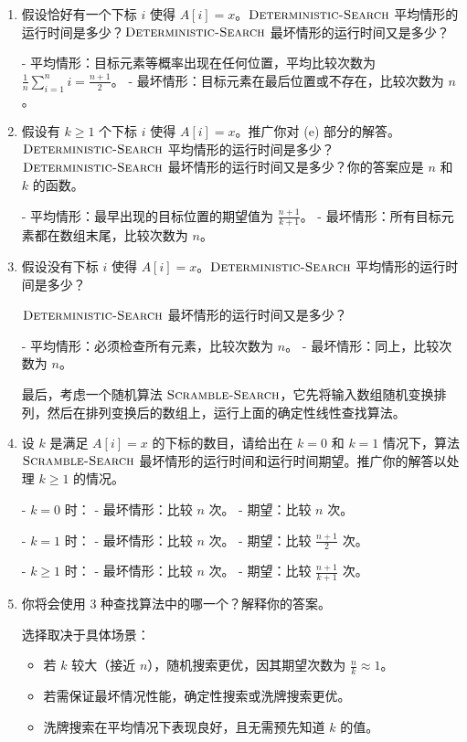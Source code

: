 \documentclass[UTF8]{ctexart}
\begin{document}
\begin{enumerate}[label=\alph*.]
			\item 假设恰好有一个下标 $i$ 使得 $A[i] = x$。$\textsc{Deterministic-Search}$ 平均情形的运行时间是多少？$\textsc{Deterministic-Search}$ 最坏情形的运行时间又是多少？
			
			- 平均情形：目标元素等概率出现在任何位置，平均比较次数为 $\frac{1}{n} \sum_{i=1}^n i = \frac{n+1}{2}$。
			- 最坏情形：目标元素在最后位置或不存在，比较次数为 $n$。
			
			\item 假设有 $k \geq 1$ 个下标 $i$ 使得 $A[i] = x$。推广你对 (e) 部分的解答。$\textsc{Deterministic-Search}$ 平均情形的运行时间是多少？$\textsc{Deterministic-Search}$ 最坏情形的运行时间又是多少？你的答案应是 $n$ 和 $k$ 的函数。
			
			- 平均情形：最早出现的目标位置的期望值为 $\frac{n+1}{k+1}$。
			- 最坏情形：所有目标元素都在数组末尾，比较次数为 $n$。
			
			\item 假设没有下标 $i$ 使得 $A[i] = x$。$\textsc{Deterministic-Search}$ 平均情形的运行时间是多少？
			
			$\textsc{Deterministic-Search}$ 最坏情形的运行时间又是多少？
			
			- 平均情形：必须检查所有元素，比较次数为 $n$。
			- 最坏情形：同上，比较次数为 $n$。
			
			最后，考虑一个随机算法 $\textsc{Scramble-Search}$，它先将输入数组随机变换排列，然后在排列变换后的数组上，运行上面的确定性线性查找算法。
			
			\item 设 $k$ 是满足 $A[i] = x$ 的下标的数目，请给出在 $k = 0$ 和 $k = 1$ 情况下，算法 $\textsc{Scramble-Search}$ 最坏情形的运行时间和运行时间期望。推广你的解答以处理 $k \geq 1$ 的情况。
			
			- $k = 0$ 时：
			- 最坏情形：比较 $n$ 次。
			- 期望：比较 $n$ 次。
			
			- $k = 1$ 时：
			- 最坏情形：比较 $n$ 次。
			- 期望：比较 $\frac{n+1}{2}$ 次。
			
			- $k \geq 1$ 时：
			- 最坏情形：比较 $n$ 次。
			- 期望：比较 $\frac{n+1}{k+1}$ 次。
			
			\item 你将会使用 3 种查找算法中的哪一个？解释你的答案。
			
			选择取决于具体场景：
			\begin{itemize}
				\item 若 $k$ 较大（接近 $n$），随机搜索更优，因其期望次数为 $\frac{n}{k} \approx 1$。
				\item 若需保证最坏情况性能，确定性搜索或洗牌搜索更优。
				\item 洗牌搜索在平均情况下表现良好，且无需预先知道 $k$ 的值。
			\end{itemize}
		\end{enumerate}
	
\end{document}
